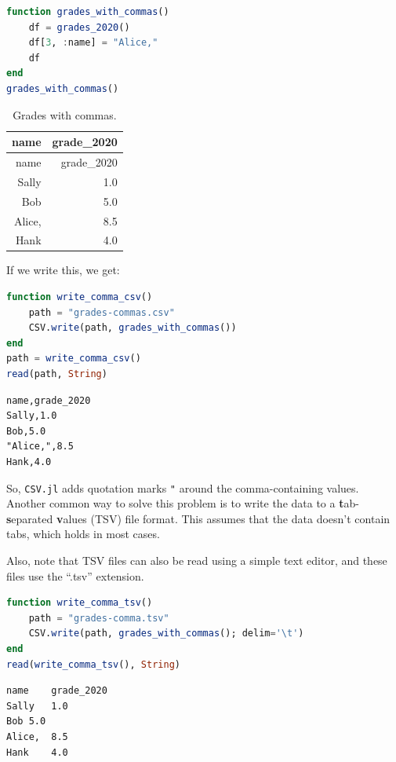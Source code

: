 \documentclass[
  notoc %
]{tufte-book}
\newcommand{\passthrough}[1]{#1}
\begin{document}
\begin{lstlisting}[language=Julia]
function grades_with_commas()
    df = grades_2020()
    df[3, :name] = "Alice,"
    df
end
grades_with_commas()
\end{lstlisting}

\hypertarget{tbl:grades_with_commas}{}
\begin{longtable}[]{@{}rr@{}}
\caption{\label{tbl:grades_with_commas}Grades with
commas.}\tabularnewline
\toprule
name & grade\_2020 \\
\midrule
\endfirsthead
\toprule
name & grade\_2020 \\
\midrule
\endhead
Sally & 1.0 \\
Bob & 5.0 \\
Alice, & 8.5 \\
Hank & 4.0 \\
\bottomrule
\end{longtable}

If we write this, we get:

\begin{lstlisting}[language=Julia]
function write_comma_csv()
    path = "grades-commas.csv"
    CSV.write(path, grades_with_commas())
end
path = write_comma_csv()
read(path, String)
\end{lstlisting}

\begin{lstlisting}[language=Output]
name,grade_2020
Sally,1.0
Bob,5.0
"Alice,",8.5
Hank,4.0

\end{lstlisting}

So, \passthrough{\lstinline!CSV.jl!} adds quotation marks
\passthrough{\lstinline!"!} around the comma-containing values. Another
common way to solve this problem is to write the data to a
\textbf{t}ab-\textbf{s}eparated \textbf{v}alues (TSV) file format. This
assumes that the data doesn't contain tabs, which holds in most cases.

Also, note that TSV files can also be read using a simple text editor,
and these files use the ``.tsv'' extension.

\begin{lstlisting}[language=Julia]
function write_comma_tsv()
    path = "grades-comma.tsv"
    CSV.write(path, grades_with_commas(); delim='\t')
end
read(write_comma_tsv(), String)
\end{lstlisting}

\begin{lstlisting}[language=Output]
name    grade_2020
Sally   1.0
Bob 5.0
Alice,  8.5
Hank    4.0

\end{lstlisting}
\end{document}
